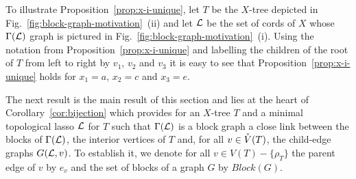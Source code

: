 To illustrate Proposition~\ref{prop:x-i-unique}, let $T$ be the $X$-tree
depicted in Fig.~\ref{fig:block-graph-motivation}~(ii) and let ${\mathcal L}$ be the set
of cords of $X$ whose $\Gamma({\mathcal L})$ graph is pictured in
Fig.~\ref{fig:block-graph-motivation}~(i).  Using the notation from
Proposition~\ref{prop:x-i-unique} and labelling the children of the root of
$T$ from left to right by $v_1$, $v_2$ and $v_3$ it is easy to see that
Proposition~\ref{prop:x-i-unique} holds for $x_1=a$, $x_2=c$ and $x_3=e$.

The next result is the main result of this section and lies at the heart of
Corollary~\ref{cor:bijection} which provides for an $X$-tree $T$ and a minimal
topological lasso ${\mathcal L}$ for $T$ such that $\Gamma({\mathcal L})$ is a block graph a
close link between the blocks of $\Gamma({\mathcal L})$, the interior vertices of $T$
and, for all $v\in \mathring{V}(T)$, the child-edge graphs $G({\mathcal L},v)$. To establish it,
we denote for all $v\in V(T)-\{\rho_T\}$ the parent edge of $v$ by $e_v$ and
the set of blocks of a graph $G$ by $Block(G)$.


